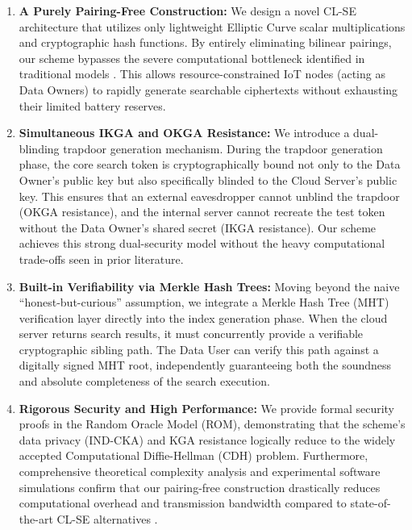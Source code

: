 \documentclass[10pt,journal,compsoc]{IEEEtran}
\begin{document}
\begin{enumerate}
    \item \textbf{A Purely Pairing-Free Construction:} We design a novel CL-SE architecture that utilizes only lightweight Elliptic Curve scalar multiplications and cryptographic hash functions. By entirely eliminating bilinear pairings, our scheme bypasses the severe computational bottleneck identified in traditional models \cite{lu2023certificateless, elhabob2020efficient}. This allows resource-constrained IoT nodes (acting as Data Owners) to rapidly generate searchable ciphertexts without exhausting their limited battery reserves.
    
    \item \textbf{Simultaneous IKGA and OKGA Resistance:} We introduce a dual-blinding trapdoor generation mechanism. During the trapdoor generation phase, the core search token is cryptographically bound not only to the Data Owner's public key but also specifically blinded to the Cloud Server's public key. This ensures that an external eavesdropper cannot unblind the trapdoor (OKGA resistance), and the internal server cannot recreate the test token without the Data Owner's shared secret (IKGA resistance). Our scheme achieves this strong dual-security model without the heavy computational trade-offs seen in prior literature.
    
    \item \textbf{Built-in Verifiability via Merkle Hash Trees:} Moving beyond the naive ``honest-but-curious'' assumption, we integrate a Merkle Hash Tree (MHT) verification layer directly into the index generation phase. When the cloud server returns search results, it must concurrently provide a verifiable cryptographic sibling path. The Data User can verify this path against a digitally signed MHT root, independently guaranteeing both the soundness and absolute completeness of the search execution.
    
    \item \textbf{Rigorous Security and High Performance:} We provide formal security proofs in the Random Oracle Model (ROM), demonstrating that the scheme's data privacy (IND-CKA) and KGA resistance logically reduce to the widely accepted Computational Diffie-Hellman (CDH) problem. Furthermore, comprehensive theoretical complexity analysis and experimental software simulations confirm that our pairing-free construction drastically reduces computational overhead and transmission bandwidth compared to state-of-the-art CL-SE alternatives \cite{liu2023pairing}.
\end{enumerate}
\end{document}
